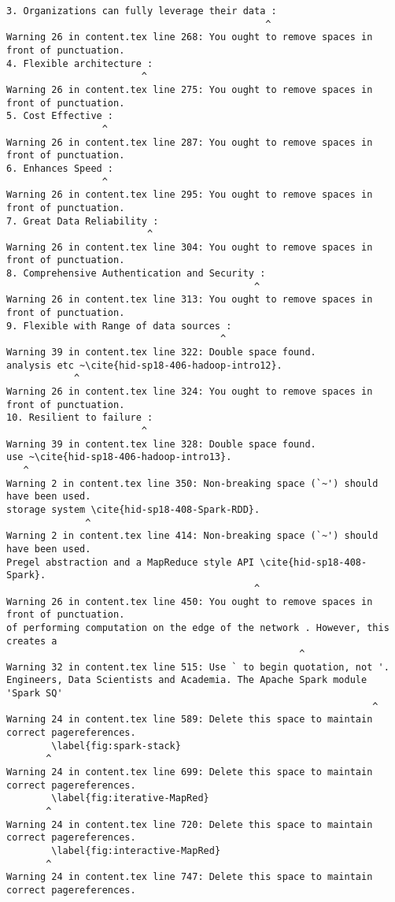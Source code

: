 \begin{tiny}
\begin{verbatim}
3. Organizations can fully leverage their data :   
                                              ^
Warning 26 in content.tex line 268: You ought to remove spaces in front of punctuation.
4. Flexible architecture :   
                        ^
Warning 26 in content.tex line 275: You ought to remove spaces in front of punctuation.
5. Cost Effective :   
                 ^
Warning 26 in content.tex line 287: You ought to remove spaces in front of punctuation.
6. Enhances Speed :   
                 ^
Warning 26 in content.tex line 295: You ought to remove spaces in front of punctuation.
7. Great Data Reliability :   
                         ^
Warning 26 in content.tex line 304: You ought to remove spaces in front of punctuation.
8. Comprehensive Authentication and Security :   
                                            ^
Warning 26 in content.tex line 313: You ought to remove spaces in front of punctuation.
9. Flexible with Range of data sources :   
                                      ^
Warning 39 in content.tex line 322: Double space found.
analysis etc ~\cite{hid-sp18-406-hadoop-intro12}.  
            ^
Warning 26 in content.tex line 324: You ought to remove spaces in front of punctuation.
10. Resilient to failure :   
                        ^
Warning 39 in content.tex line 328: Double space found.
use ~\cite{hid-sp18-406-hadoop-intro13}.  
   ^
Warning 2 in content.tex line 350: Non-breaking space (`~') should have been used.
storage system \cite{hid-sp18-408-Spark-RDD}.  
              ^
Warning 2 in content.tex line 414: Non-breaking space (`~') should have been used.
Pregel abstraction and a MapReduce style API \cite{hid-sp18-408-Spark}.  
                                            ^
Warning 26 in content.tex line 450: You ought to remove spaces in front of punctuation.
of performing computation on the edge of the network . However, this creates a   
                                                    ^
Warning 32 in content.tex line 515: Use ` to begin quotation, not '.
Engineers, Data Scientists and Academia. The Apache Spark module 'Spark SQ'   
                                                                 ^
Warning 24 in content.tex line 589: Delete this space to maintain correct pagereferences.
        \label{fig:spark-stack}  
       ^
Warning 24 in content.tex line 699: Delete this space to maintain correct pagereferences.
        \label{fig:iterative-MapRed}  
       ^
Warning 24 in content.tex line 720: Delete this space to maintain correct pagereferences.
        \label{fig:interactive-MapRed}  
       ^
Warning 24 in content.tex line 747: Delete this space to maintain correct pagereferences.

\end{verbatim}
\end{tiny}
